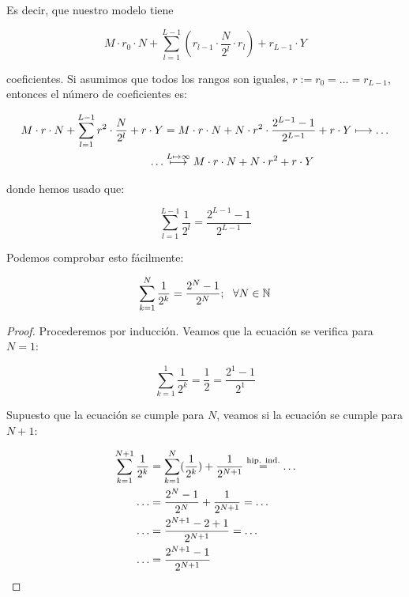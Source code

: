 Es decir, que nuestro modelo tiene

\begin{equation}
	M \cdot r_0 \cdot N + \sum_{l = 1}^{L-1} (r_{l-1} \cdot \frac{N}{2^l} \cdot r_l ) +
	r_{L-1} \cdot Y
\end{equation}

coeficientes. Si asumimos que todos los rangos son iguales, $r := r_0 = \ldots = r_{L-1}$, entonces el número de coeficientes es:

\begin{equation}
	\begin{split}
		M \cdot r \cdot N + \sum_{l = 1}^{L-1} r^2 \cdot \frac{N}{2^l} + r \cdot Y &= M \cdot r \cdot N + N \cdot r^2 \cdot \frac{2^{L-1} - 1}{2^{L-1}} + r \cdot Y \longmapsto \ldots \\
		\ldots & \encima{\longmapsto}{L \mapsto \infty} M \cdot r \cdot N + N \cdot r^2 + r \cdot Y
	\end{split}
\end{equation}

donde hemos usado que:

\begin{equation}
	\sum_{l = 1}^{L-1} \frac{1}{2^l} = \frac{2^{L-1} - 1}{2^{L-1}}
\end{equation}

Podemos comprobar esto fácilmente:

\begin{proposicion}
	\begin{equation}
		\sum_{k = 1}^{N} \frac{1}{2^k} = \frac{2^N - 1}{2^N}; \dspace \forall N \in \N
	\end{equation}
\end{proposicion}

\begin{proof}
	Procederemos por inducción. Veamos que la ecuación se verifica para $N = 1$:

	\begin{equation}
		\sum_{k = 1}^{1} \frac{1}{2^k} = \frac{1}{2} = \frac{2^1 - 1}{2^1}
	\end{equation}

	Supuesto que la ecuación se cumple para $N$, veamos si la ecuación se cumple para $N + 1$:

	\begin{equation}
		\begin{split}
			\sum_{k = 1}^{N+1} \frac{1}{2^k} &= \sum_{k = 1}^{N} (\frac{1}{2^k}) + \frac{1}{2^{N+1}} \encima{=}{\text{hip. ind.}} \ldots \\
			\ldots &= \frac{2^N - 1}{2^N} + \frac{1}{2^{N+1}} = \ldots \\
			\ldots &= \frac{2^{N+1} - 2 + 1}{2^{N+1}} = \ldots \\
			\ldots &= \frac{2^{N+1} - 1}{2^{N+1}}
		\end{split}
	\end{equation}
\end{proof}

